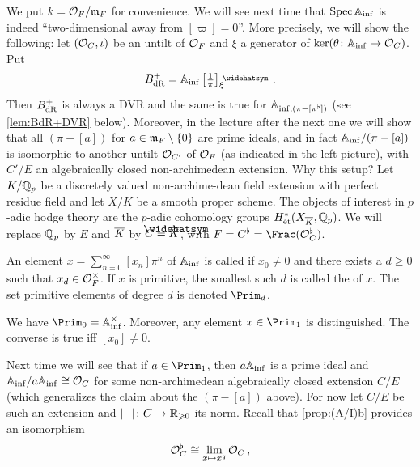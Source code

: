 \documentclass[a4paper, 10pt, oneside, DIV=9, chapterprefix=true, numbers=enddot,bibliography=totoc]{scrbook}
\begin{document}
We put $k=\mathcal{O}_F/\mathfrak{m}_F$ for convenience. We will see next time that $\operatorname{Spec}\mathbb{A}_{\mathrm{inf}}$ is indeed \enquote{two-dimensional away from $[\varpi]=0$}. More precisely, we will show the following: let $(\mathcal{O}_C,\iota)$ be an untilt of $\mathcal{O}_F$ and $\xi$ a generator of $\ker(\theta\colon \IA_\inf\morphism \Oo_C)$. Put
\begin{equation*}
	B_\dR^+=\IA_\inf\left[\textstyle \frac 1\pi\right]_\xi^\complete\,.
\end{equation*}
Then $B_{\mathrm{dR}}^+$ is always a DVR and the same is true for $\mathbb{A}_{\mathrm{inf},(\pi-[\pi^\flat])}$ (see \cref{lem:BdR+DVR} below). Moreover, in the lecture after the next one we will show that all $(\pi-[a])$ for $a\in\mathfrak{m}_F\setminus\{0\}$ are prime ideals, and in fact $\mathbb{A}_{\mathrm{inf}}/(\pi-[a])$ is isomorphic to another untilt $\mathcal{O}_{C'}$ of $\mathcal{O}_F$ (as indicated in the left picture), with $C'/E$ an algebraically closed non-archimedean extension.
Why this setup? Let $K/\mathbb{Q}_p$ be a discretely valued non-archime-dean field extension with perfect residue field and let $X/K$ be a smooth proper scheme.  The objects of interest in $p$-adic hodge theory are the $p$-adic cohomology groups $H_\et^*(X_{\ov{K}},\IQ_p)$. We will replace $\mathbb{Q}_p$ by $E$ and $\ov{K}$ by $C=\roof{\ov{K}}$, with $F=C^\flat=\Frac(\Oo_C^\flat)$.
\begin{defi}
	An element $x=\sum_{n=0}^\infty [x_n]\pi^n$ of $\mathbb{A}_{\mathrm{inf}}$ is called  if $x_0\neq 0$ and there exists a $d\geq 0$ such that $x_d\in \mathcal{O}_F^\times$. If $x$ is primitive, the smallest such $d$ is called the  of $x$. The set primitive elements of degree $d$ is denoted $\Prim_d$.
\end{defi}
\begin{exm}
	We have $\Prim_0=\IA_\inf^\times$. Moreover, any element $x\in \Prim_1$ is distinguished. The converse is true iff $[x_0]\neq 0$.
\end{exm}
Next time we will see that if $a\in \Prim_1$, then $a\mathbb{A}_{\mathrm{inf}}$ is  a prime ideal and $\mathbb{A}_{\mathrm{inf}}/a\mathbb{A}_{\mathrm{inf}}\cong \mathcal{O}_C$ for some non-archimedean algebraically closed extension $C/E$ (which generalizes the claim about the $(\pi-[a])$ above). For now let $C/E$ be such an extension and $|\blank|\colon C\morphism \IR_{\geq 0}$ its norm. Recall that \cref{prop:(A/I)b} provides an isomorphism
\begin{equation*}
	\mathcal{O}_C^\flat\cong \lim_{x\mapsto x^q}\mathcal{O}_C\,,
\end{equation*}
\end{document}
